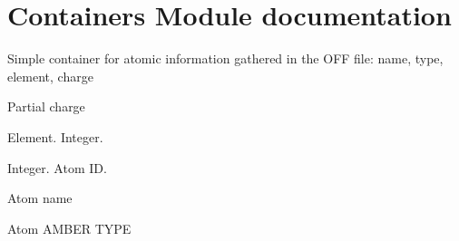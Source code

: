 \documentclass[letterpaper,10pt,english]{sphinxmanual}
\begin{document}
\chapter{Containers Module documentation}
\label{containers:module-pyMDMix.containers}\label{containers::doc}\label{containers:containers-module-documentation}

\begin{fulllineitems}
\label{containers:pyMDMix.containers.Atom}
Simple container for atomic information gathered in the OFF file: name, type, element, charge

\begin{fulllineitems}
\label{containers:pyMDMix.containers.Atom.charge}
Partial charge

\end{fulllineitems}


\begin{fulllineitems}
\label{containers:pyMDMix.containers.Atom.element}
Element. Integer.

\end{fulllineitems}


\begin{fulllineitems}
\label{containers:pyMDMix.containers.Atom.id}
Integer. Atom ID.

\end{fulllineitems}


\begin{fulllineitems}
\label{containers:pyMDMix.containers.Atom.name}
Atom name

\end{fulllineitems}


\begin{fulllineitems}
\label{containers:pyMDMix.containers.Atom.type}
Atom AMBER TYPE

\end{fulllineitems}


\end{fulllineitems}
\end{document}
